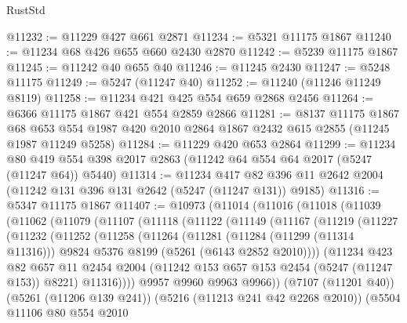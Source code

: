 \begin{lexlean}{RustStd}
\begin{coremodule}
@11232 := @11229 @427 @661 @2871
@11234 := @5321 @11175 @1867
@11240 := @11234 @68 @426 @655 @660 @2430 @2870
@11242 := @5239 @11175 @1867
@11245 := @11242 @40 @655 @40
@11246 := @11245 @2430
@11247 := @5248 @11175
@11249 := @5247 (@11247 @40)
@11252 := @11240 (@11246 @11249 @8119)
@11258 := @11234 @421 @425 @554 @659 @2868 @2456
@11264 := @6366 @11175 @1867 @421 @554 @2859 @2866
@11281 := @8137
    @11175
    @1867
    @68
    @653
    @554
    @1987
    @420
    @2010
    @2864
    @1867
    @2432
    @615
    @2855
    (@11245 @1987 @11249 @5258)
@11284 := @11229 @420 @653 @2864
@11299 := @11234
    @80
    @419
    @554
    @398
    @2017
    @2863
    (@11242 @64 @554 @64 @2017 (@5247 (@11247 @64)) @5440)
@11314 := @11234
    @417
    @82
    @396
    @11
    @2642
    @2004
    (@11242 @131 @396 @131 @2642 (@5247 (@11247 @131)) @9185)
@11316 := @5347 @11175 @1867
@11407 := @10973
    (@11014
      (@11016
        (@11018
          (@11039
            (@11062
              (@11079
                (@11107
                  (@11118
                    (@11122
                      (@11149
                        (@11167
                          (@11219
                            (@11227
                              (@11232
                                (@11252
                                  (@11258
                                    (@11264
                                      (@11281
                                        (@11284 (@11299 (@11314 @11316)))
                                        @9824
                                        @5376
                                        @8199
                                        (@5261 (@6143 @2852 @2010))))
                                    (@11234
                                      @423
                                      @82
                                      @657
                                      @11
                                      @2454
                                      @2004
                                      (@11242 @153 @657 @153 @2454 (@5247 (@11247 @153)) @8221)
                                      @11316))))
                              @9957
                              @9960
                              @9963
                              @9966))
                          (@7107 (@11201 @40))
                          (@5261 (@11206 @139 @241))
                          (@5216 (@11213 @241 @42 @2268 @2010))
                          (@5504
                            @11106
                            @80
                            @554
                            @2010

\end{coremodule}
\end{lexlean}
